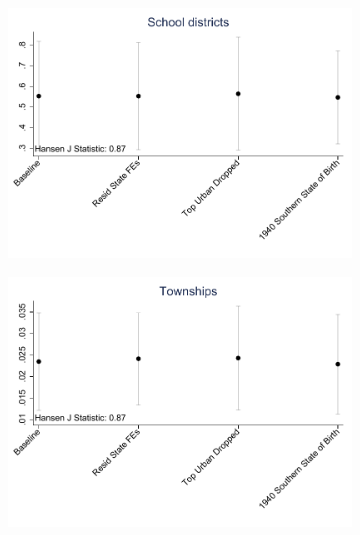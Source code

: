 \documentclass{article}
\begin{document}
\begin{landscape}
\begin{figure}[htbp]
\begin{subfigure}{0.4\textwidth}
        \includegraphics[width=\linewidth]{figures/exogeneity_tests/D16_alt_inst_pooled_schdist_ind_new_ctrls.pdf}
        \label{fig:sub3}
    \end{subfigure}
    \begin{subfigure}{0.4\textwidth}
        \includegraphics[width=\linewidth]{figures/exogeneity_tests/D16_alt_inst_pooled_gen_town_new_ctrls.pdf}
        \label{fig:sub4}
    \end{subfigure}
    \begin{subfigure}{0.4\textwidth}

\end{subfigure}
\end{figure}
\end{landscape}
\end{document}
